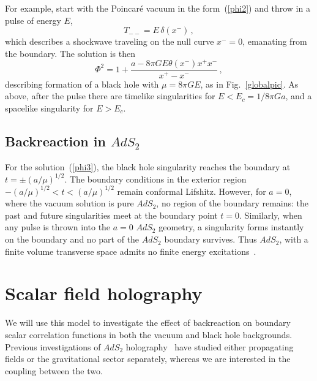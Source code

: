 \documentclass[12pt]{article}
\newcommand{\sect}[1]{\section{#1}\setcounter{equation}{0}}
\newcommand{\be}{\begin{equation}}
\newcommand{\ee}{\end{equation}}
\begin{document}

For example, start with the Poincar\'e vacuum in the form~(\ref{phi2}) and throw in a pulse of energy $E$,
\begin{equation}
T_{--}  = E  \,\delta(x^-) \,,
\end{equation}
which describes a shockwave traveling on the null curve $x^- = 0$, emanating from the boundary.   The solution is then
\be
\Phi^2 = 1 + \frac{a - 8\pi G E \theta(x^-) x^+ x^-}{x^+ - x^-} \,, \label{pulsol}
\ee
describing formation of a black hole with $\mu = 8\pi GE$, as in Fig.~\ref{globalpic}. As above, after the pulse there are timelike singularities for $E < E_c = 1/8 \pi G a$, and a spacelike singularity for $E > E_c$.

\subsection{Backreaction in $AdS_2$}

For the solution~(\ref{phi3}), the black hole singularity reaches the boundary at $t = \pm (a/\mu)^{1/2}$.  The boundary conditions in the exterior region $-(a/\mu)^{1/2} < t < (a/\mu)^{1/2}$ remain conformal Lifshitz.  However, for $a=0$, where the vacuum solution is pure $AdS_2$, no region of the boundary remains: the past and future singularities meet at the boundary point $t=0$.  Similarly, when any pulse is thrown into the $a=0$ $AdS_2$ geometry, a singularity forms instantly on the boundary and no part of the $AdS_2$ boundary survives.  Thus $AdS_2$, with a finite volume transverse space admits no finite energy excitations~\cite{Maldacena:1998uz}.




\sect{Scalar field holography}

We will use this model to investigate the effect of backreaction on boundary scalar correlation functions in both the vacuum and black hole backgrounds.  Previous investigations of $AdS_2$ holography~\cite{ads2holo} have studied either propagating fields or the gravitational sector separately, whereas we are interested in the coupling between the two.
\end{document}
